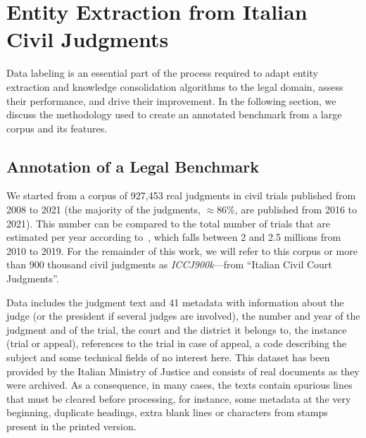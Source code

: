 \section{Entity Extraction from Italian Civil Judgments}
\label{sec:eejudgements}

Data labeling is an essential part of the process required to adapt entity extraction and knowledge consolidation algorithms to the legal domain, assess their performance, and drive their improvement. In the following section, we discuss the methodology used to create an annotated benchmark from a large corpus and its features.

\subsection{Annotation of a Legal Benchmark}

We started from a corpus of 927,453 real judgments in civil trials published from 2008 to 2021 (the majority of the judgments, $\approx 86\%$, are published from 2016 to 2021).
This number can be compared to the total number of trials that are estimated per year according to~\cite{bankitalia}, which falls between 2 and 2.5 millions from 2010 to 2019.
For the remainder of this work, we will refer to this corpus or more than 900 thousand civil judgments as \emph{ICCJ900k}---from ``Italian Civil Court Judgments''.

Data includes the judgment text and 41 metadata with information about the judge (or the president if several judges are involved), the number and year of the judgment and of the trial, the court and the district it belongs to, the instance (trial or appeal), references to the trial in case of appeal, a code describing the subject and some technical fields of no interest here. This dataset has been provided by the Italian Ministry of Justice and consists of real documents as they were archived. As a consequence, in many cases, the texts contain spurious lines that must be cleared before processing, for instance, some metadata at the very beginning, duplicate headings, extra blank lines or characters from stamps present in the printed version.

